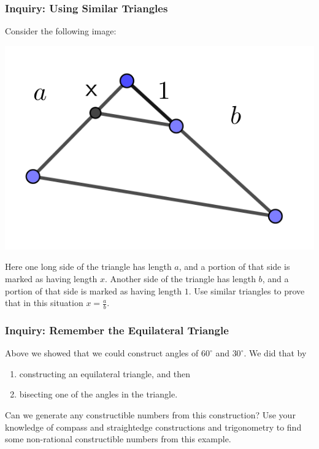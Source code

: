 \documentclass[11pt]{article}
\newenvironment{task}
	{\begin{mdframed}[linecolor=lightgray, linewidth=3pt]\raggedright}
	{\end{mdframed}}
\theoremstyle{definition}
\begin{document}
\subsubsection{Inquiry: Using Similar Triangles}
\begin{task}
  Consider the following image:
  \begin{center}
    \includegraphics[scale=.1]{Images/a_over_b.png}
  \end{center}
  Here one long side of the triangle has length $a$, and a portion of that side is marked as having length $x$. Another side of the
  triangle has length $b$, and a portion of that side is marked as having length $1$. Use similar triangles to prove that in this situation $x = \frac{a}{b}$.
\end{task}\newpage

\subsubsection{Inquiry: Remember the Equilateral Triangle}
\begin{task}
  Above we showed that we could construct angles of $60^\circ$ and $30^\circ$. We did that by
  \begin{enumerate}
    \item constructing an equilateral triangle, and then
    \item bisecting one of the angles in the triangle.
  \end{enumerate}
  Can we generate any constructible numbers from this construction? Use your knowledge of compass and straightedge constructions and trigonometry
  to find some non-rational constructible numbers from this example.
\end{task}\newpage
\end{document}
